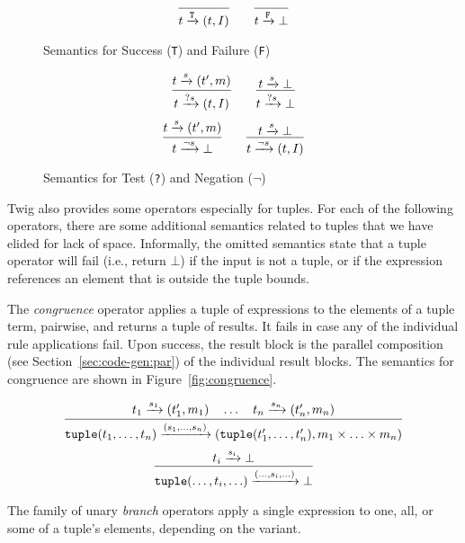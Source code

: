 \begin{figure}[ht]
\[
\infer
  {t \arr{\mathtt{T}} (t,I)}
  {}
\qquad
\infer
  {t \arr{\mathtt{F}} \bot}
  {}
\]
\caption{Semantics for Success (\texttt{T}) and Failure (\texttt{F})}
\label{fig:basic1}
\end{figure}

\begin{figure}[ht]
\[
\infer
  {t \arr{?s} (t,I)}
  {t \arr{s} (t',m)}
\qquad 
\infer
  {t \arr{?s} \bot}
  {t \arr{s} \bot}
\]
\[
\infer
  {t \arr{\lnot s} \bot}
  {t \arr{s} (t',m)}
\qquad 
\infer
  {t \arr{\lnot s} (t,I)}
  {t \arr{s} \bot}
\]
\caption{Semantics for Test (\texttt{?}) and Negation ($\lnot$)}
\label{fig:basic2}
\end{figure}

Twig also provides some operators especially for tuples. For each
of the following operators, there are some additional semantics
related to tuples that we have elided for lack of space.
Informally, the omitted semantics state that a tuple operator will
fail (i.e., return $\bot$) if the input is not a tuple, or if the
expression references an element that is outside the tuple bounds.


The \emph{congruence} operator applies a tuple of expressions to
the elements of a tuple term, pairwise, and returns a tuple of
results. It fails in case any of the individual rule applications
fail. Upon success, the result block is the parallel composition
(see Section~\ref{sec:code-gen:par}) of the individual result
blocks. The semantics for congruence are shown in
Figure~\ref{fig:congruence}.

\begin{figure*}[ht]
\[
\infer
  {\mathtt{tuple}(t_1,\ldots,t_n)\arr{(s_1,\ldots,s_n)} (\mathtt{tuple}(t_1',\ldots,t_n'),m_1 \times \ldots \times m_n)}
  {t_1 \arr{s_1} (t_1',m_1) \quad \ldots \quad t_n \arr{s_n} (t_n',m_n)}
\]
\[
\infer
  {\mathtt{tuple}(\ldots,t_i,\ldots)\arr{(\ldots,s_i,\ldots)}\bot}
  {t_i \arr{s_i} \bot}
\]
\caption{Semantics for congruence operator}
\label{fig:congruence}
\end{figure*}

The family of unary \emph{branch} operators apply a single
expression to one, all, or some of a tuple's elements, depending
on the variant.

